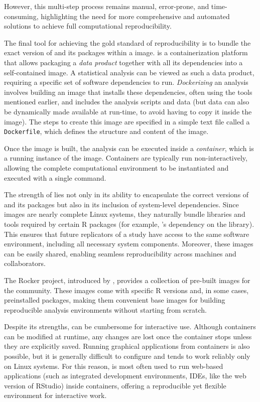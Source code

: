 \documentclass[
  article]{jss}
\begin{document}
However, this multi-step process remains manual, error-prone, and
time-consuming, highlighting the need for more comprehensive and
automated solutions to achieve full computational reproducibility.

The final tool for achieving the gold standard of reproducibility is to
bundle the exact version of  and its packages within a
 image.  is a containerization platform that
allows packaging a \emph{data product} together with all its
dependencies into a self-contained image. A statistical analysis can be
viewed as such a data product, requiring a specific set of software
dependencies to run. \emph{Dockerizing} an analysis involves building an
image that installs these dependencies, often using the tools mentioned
earlier, and includes the analysis scripts and data (but data can also
be dynamically made available at run-time, to avoid having to copy it
inside the image). The steps to create this image are specified in a
simple text file called a \texttt{Dockerfile}, which defines the
structure and content of the  image.

Once the image is built, the analysis can be executed inside a
\emph{container}, which is a running instance of the image. Containers
are typically run non-interactively, allowing the complete computational
environment to be instantiated and executed with a single command.

The strength of  lies not only in its ability to encapsulate
the correct versions of  and its packages but also in its
inclusion of system-level dependencies. Since  images are
nearly complete Linux systems, they naturally bundle libraries and tools
required by certain R packages (for example, 's dependency
on the  library). This ensures that future replicators
of a study have access to the same software environment, including all
necessary system components. Moreover, these images can be easily
shared, enabling seamless reproducibility across machines and
collaborators.

The Rocker project, introduced by \citet{boettiger2017}, provides a
collection of pre-built  images for the 
community. These images come with specific R versions and, in some
cases, preinstalled packages, making them convenient base images for
building reproducible analysis environments without starting from
scratch.

Despite its strengths,  can be cumbersome for interactive
use. Although containers can be modified at runtime, any changes are
lost once the container stops unless they are explicitly saved. Running
graphical applications from containers is also possible, but it is
generally difficult to configure and tends to work reliably only on
Linux systems. For this reason,  is most often used to run
web-based applications (such as integrated development environments,
IDEs, like the web version of RStudio) inside containers, offering a
reproducible yet flexible environment for interactive work.
\end{document}
